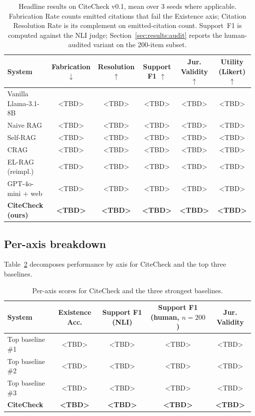 \documentclass[11pt]{article}
\begin{document}
\begin{table}[t]
\centering
\small
\begin{tabular}{lccccc}
\toprule
\textbf{System} &
  \textbf{Fabrication $\downarrow$} &
  \textbf{Resolution $\uparrow$} &
  \textbf{Support F1 $\uparrow$} &
  \textbf{Jur. Validity $\uparrow$} &
  \textbf{Utility (Likert) $\uparrow$} \\
\midrule
Vanilla Llama-3.1-8B            & <TBD> & <TBD> & <TBD> & <TBD> & <TBD> \\
Naive RAG                       & <TBD> & <TBD> & <TBD> & <TBD> & <TBD> \\
Self-RAG                        & <TBD> & <TBD> & <TBD> & <TBD> & <TBD> \\
CRAG                            & <TBD> & <TBD> & <TBD> & <TBD> & <TBD> \\
EL-RAG (reimpl.)                & <TBD> & <TBD> & <TBD> & <TBD> & <TBD> \\
GPT-4o-mini + web               & <TBD> & <TBD> & <TBD> & <TBD> & <TBD> \\
\textbf{CiteCheck (ours)}       & \textbf{<TBD>} & \textbf{<TBD>}
                                & \textbf{<TBD>} & \textbf{<TBD>}
                                & \textbf{<TBD>} \\
\bottomrule
\end{tabular}
\caption{Headline results on CiteCheck v0.1, mean over 3 seeds where
applicable. Fabrication Rate counts emitted citations that fail the
Existence axis; Citation Resolution Rate is its complement on
emitted-citation count. Support~F1 is computed against the NLI judge;
Section~\ref{sec:results:audit} reports the human-audited variant on
the 200-item subset.}
\label{tab:headline}
\end{table}

\subsection{Per-axis breakdown}
\label{sec:results:peraxis}

Table~\ref{tab:peraxis} decomposes performance by axis for CiteCheck
and the top three baselines.

\begin{table}[t]
\centering
\small
\begin{tabular}{lcccc}
\toprule
\textbf{System} &
  \textbf{Existence Acc.} &
  \textbf{Support F1 (NLI)} &
  \textbf{Support F1 (human, $n{=}200$)} &
  \textbf{Jur. Validity} \\
\midrule
Top baseline \#1     & <TBD> & <TBD> & <TBD> & <TBD> \\
Top baseline \#2     & <TBD> & <TBD> & <TBD> & <TBD> \\
Top baseline \#3     & <TBD> & <TBD> & <TBD> & <TBD> \\
\textbf{CiteCheck}   & \textbf{<TBD>} & \textbf{<TBD>}
                     & \textbf{<TBD>} & \textbf{<TBD>} \\
\bottomrule
\end{tabular}
\caption{Per-axis scores for CiteCheck and the three strongest
baselines.}
\label{tab:peraxis}
\end{table}
\end{document}
